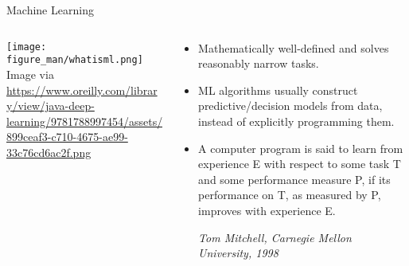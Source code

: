 \documentclass[11pt,compress,t,notes=noshow, xcolor=table]{beamer}
\begin{document}

\begin{frame}{Machine Learning}

\begin{columns}
\begin{column}{0.65\textwidth}
\begin{center}
  \texttt{[image: figure\_man/whatisml.png]}\\[3ex]
  \tiny{Image via \url{https://www.oreilly.com/library/view/java-deep-learning/9781788997454/assets/899ceaf3-c710-4675-ae99-33c76cd6ac2f.png}}
\end{center}
\end{column}
\begin{column}{0.45\textwidth}
\begin{footnotesize}
\begin{itemize}
	\item Mathematically well-defined and solves reasonably narrow tasks.
	\item ML algorithms usually construct predictive/decision models from data, instead of explicitly programming them.
    \item A computer program is said to learn from experience E with respect to
  some task T and some performance measure P, if its performance on T, as 
  measured by P, improves with experience E. \\
  \begin{footnotesize}
  \emph{Tom Mitchell, Carnegie Mellon University, 1998}
  \end{footnotesize}
\end{itemize}
\end{footnotesize}
\end{column}
\end{columns}
  
\end{frame}
\end{document}
